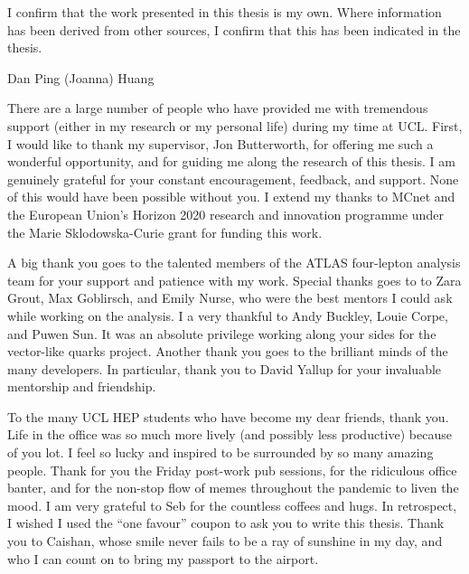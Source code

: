 \begin{declaration}
  I confirm that the work presented in this thesis is my own. Where information has been derived from other sources, I confirm that this has been indicated in the thesis.
  \vspace*{1cm}
  \begin{flushright}
    Dan Ping (Joanna) Huang
  \end{flushright}
\end{declaration}


\begin{acknowledgements}
    There are a large number of people who have provided me with tremendous support (either in my research or my personal life) during my time at UCL. First, I would like to thank my supervisor, Jon Butterworth, for offering me such a wonderful opportunity, and for guiding me along the research of this thesis. I am genuinely grateful for your constant encouragement, feedback, and support. None of this would have been possible without you. I extend my thanks to MCnet and the European Union’s Horizon 2020 research and innovation programme under the Marie Sklodowska-Curie grant for funding this work. 
    
    A big thank you goes to the talented members of the ATLAS four-lepton analysis team for your support and patience with my work. Special thanks goes to to Zara Grout, Max Goblirsch, and Emily Nurse, who were the best mentors I could ask while working on the analysis. I a very thankful to Andy Buckley, Louie Corpe, and Puwen Sun. It was an absolute privilege working along your sides for the vector-like quarks project. Another thank you goes to the brilliant minds of the many \contur developers. In particular, thank you to David Yallup for your invaluable mentorship and friendship. 
    
    To the many UCL HEP students who have become my dear friends, thank you. Life in the office was so much more lively (and possibly less productive) because of you lot. I feel so lucky and inspired to be surrounded by so many amazing people. Thank for you the Friday post-work pub sessions, for the ridiculous office banter, and for the non-stop flow of memes throughout the pandemic to liven the mood. I am very grateful to Seb for the countless coffees and hugs. In retrospect, I wished I used the “one favour” coupon to ask you to write this thesis. Thank you to Caishan, whose smile never fails to be a ray of sunshine in my day, and who I can count on to bring my passport to the airport.
    

\end{acknowledgements}
